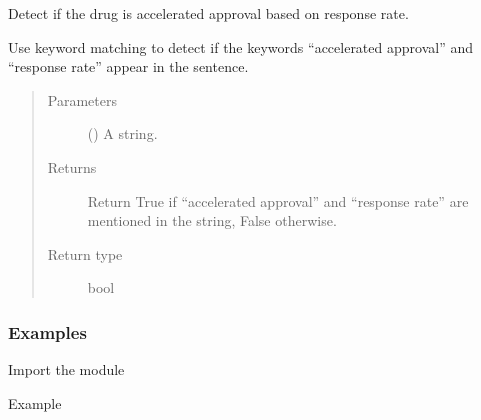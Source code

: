 \documentclass[letterpaper,10pt,english]{sphinxmanual}
\begin{document}

\begin{fulllineitems}
\label{\detokenize{biomarker_extraction:biomarker_extraction.is_accelerated_approval_rate}}
\sphinxAtStartPar
Detect if the drug is accelerated approval based on response rate.

\sphinxAtStartPar
Use keyword matching to detect if the keywords “accelerated approval” and “response rate” appear in the sentence.
\begin{quote}\begin{description}
\item[{Parameters}] \leavevmode
\sphinxAtStartPar
{} () \textendash{} A string.

\item[{Returns}] \leavevmode
\sphinxAtStartPar
Return True if “accelerated approval” and “response rate” are mentioned in the string, False otherwise.

\item[{Return type}] \leavevmode
\sphinxAtStartPar
bool

\end{description}\end{quote}
\subsubsection*{Examples}

\sphinxAtStartPar
Import the module

\begin{sphinxVerbatim}[commandchars=\\\{\}]
   
\end{sphinxVerbatim}

\sphinxAtStartPar
Example

\begin{sphinxVerbatim}[commandchars=\\\{\}]
  
  
\end{sphinxVerbatim}

\end{fulllineitems}
\end{document}

